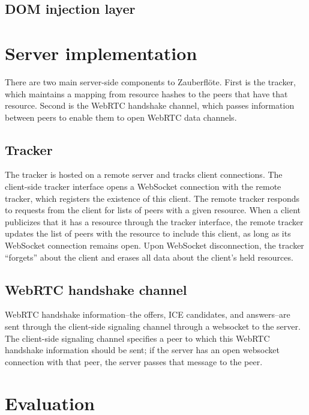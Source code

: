 \documentclass[letterpaper,twocolumn,10pt]{article}
\newcommand{\zbf}{Zauberfl\"{o}te\xspace}
\begin{document}
\subsection{DOM injection layer}

\section{Server implementation}

There are two main server-side components to \zbf. First is the tracker,
which maintains a mapping from resource hashes to the peers that have that
resource. Second is the WebRTC handshake channel, which passes information
between peers to enable them to open WebRTC data channels.

\subsection{Tracker}
The tracker is hosted on a remote server and tracks client connections.
The client-side tracker interface opens a WebSocket connection with the remote tracker,
which registers the existence of this client. The remote tracker responds to
requests from the client for lists of peers with a given resource. When a client
publicizes that it has a resource through the tracker interface, the remote tracker updates
the list of peers with the resource to include this client, as
long as its WebSocket connection remains open. Upon WebSocket disconnection,
the tracker ``forgets'' about the client and erases all data about the client's
held resources.

\subsection{WebRTC handshake channel}

WebRTC handshake information--the offers, ICE candidates, and answers--are
sent through the client-side signaling channel through a websocket to
the server. The client-side signaling channel specifies a peer to which
this WebRTC handshake information should be sent; if the server has an open
websocket connection with that peer, the server passes that message to the peer.

\section{Evaluation}

\end{document}
